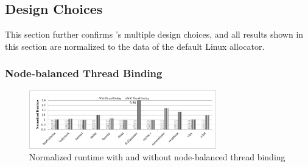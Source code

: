 



 

\subsection{Design Choices}
\label{sec:design}

This section further confirms \NM{}'s multiple design choices, and all results shown in this section are normalized to the data of the default Linux allocator.  

\subsubsection{Node-balanced Thread Binding}
\label{sec: threadbinding}

\begin{figure}[!h]
    \centering
    \includegraphics[width=3.2in]{figure/WO-pthread-binding.pdf}
    \caption{Normalized runtime with and without node-balanced thread binding}
    \label{binding-pthread-scalibity}
\end{figure}

